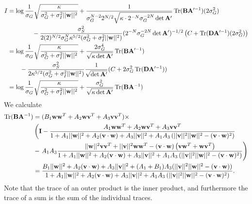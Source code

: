 \documentclass[11pt]{article}
\DeclareMathOperator{\Tr}{Tr}
\begin{document}
\begin{align}
	I &= \log \frac{1}{\sigma_G} \sqrt{\frac{\kappa}{\sigma_G^2 + \sigma_I^2 ||\mathbf{w}||^2}} +\frac{1}{\sigma_G^{N-2} 2^{N/2} \sqrt{\kappa  \cdot 2^{-N} \sigma_G^{-2N}\det \mathbf{A}'}}\Tr(\mathbf{B} \mathbf{A}'^{-1}) (2\sigma_G^2) \notag \\
	&\qquad \qquad -\frac{\sigma_S^2}{2(2)^{N/2} \sigma_G^N \kappa^{5/2} (\sigma_G^2 + \sigma_I^2 ||\mathbf{w}||^2)}(2^{-N}\sigma_G^{-2N}\det \mathbf{A}')^{-1/2} \left(C + \Tr (\mathbf{D}\mathbf{A}'^{-1}) (2\sigma_G^2)\right) \\
	&= \log \frac{1}{\sigma_G} \sqrt{\frac{\kappa}{\sigma_G^2 + \sigma_I^2 ||\mathbf{w}||^2}} + \frac{2\sigma_G^4}{\sqrt{\kappa \det \mathbf{A}'}}\Tr (\mathbf{B} \mathbf{A}'^{-1}) \notag \\
	&\qquad -\frac{\sigma_S^2}{2\kappa^{5/2} (\sigma_G^2 + \sigma_I^2 ||\mathbf{w}||^2)} \frac{1}{\sqrt{\det \mathbf{A}'}} (C + 2\sigma_G^2 \Tr (\mathbf{D}\mathbf{A}'^{-1})) \\
	&= \log \frac{1}{\sigma_G} \sqrt{\frac{\kappa}{\sigma_G^2 + \sigma_I^2 ||\mathbf{w}||^2}} + \frac{\sigma_G^2}{\sqrt{\kappa \det \mathbf{A}'}} \Tr (\mathbf{B} \mathbf{A}^{-1})
\end{align}
We calculate 
\begin{align}
	\Tr(\mathbf{B}\mathbf{A}^{-1}) &= (B_1 \mathbf{ww}^T + A_2 \mathbf{wv}^T + A_3 \mathbf{vv}^T) \times \notag \\
		& \left(\mathbf{I} - \frac{A_1 \mathbf{ww}^T + A_2 \mathbf{wv}^T + A_3 \mathbf{vv}^T}{1 + A_1 ||\mathbf{w}||^2 + A_2 (\mathbf{v}\cdot\mathbf{w}) + A_3 ||\mathbf{v}||^2 +A_1 A_3 \left(||\mathbf{v}||^2||\mathbf{w}||^2 - (\mathbf{v}\cdot\mathbf{w})^2\right)} \right.\notag \\
	&- \left. A_1 A_3\frac{||\mathbf{w}||^2 \mathbf{vv}^T + ||\mathbf{v}||^2 \mathbf{ww}^T -(\mathbf{v}\cdot \mathbf{w}) \left(\mathbf{vw}^T +\mathbf{wv}^T\right)}{1 + A_1 ||\mathbf{w}||^2 + A_2 (\mathbf{v}\cdot\mathbf{w}) + A_3 ||\mathbf{v}||^2 +A_1 A_3 \left(||\mathbf{v}||^2||\mathbf{w}||^2 - (\mathbf{v}\cdot\mathbf{w})^2\right)}\right) \\
	&= \frac{B_1 ||\mathbf{w}||^2 + A_2 (\mathbf{v}\cdot\mathbf{w}) + A_3 ||\mathbf{v}||^2 + (A_1 + B_1) A_3 (||\mathbf{v}||^2 ||\mathbf{w}||^2 - (\mathbf{v}\cdot\mathbf{w}))}{1 + A_1 ||\mathbf{w}||^2 + A_2 (\mathbf{v}\cdot\mathbf{w}) + A_3 ||\mathbf{v}||^2 +A_1 A_3 \left(||\mathbf{v}||^2||\mathbf{w}||^2 - (\mathbf{v}\cdot\mathbf{w})^2\right)}.
\end{align}
Note that the trace of an outer product is the inner product, and furthermore the trace of a sum is the sum of the individual traces. 
\end{document}
